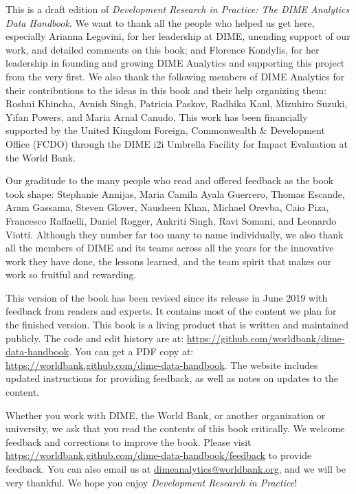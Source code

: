 This is a draft edition of
\textit{Development Research in Practice:
The DIME Analytics Data Handbook}.
We want to thank all the people who helped us get here, especially
Arianna Legovini, for her leadership at DIME, unending support of our work, 
and detailed comments on this book; and 
Florence Kondylis, for her leadership in founding and growing DIME Analytics
and supporting this project from the very first.
We also thank the following members 
of DIME Analytics for their contributions 
to the ideas in this book and their help organizing them: 
Roshni Khincha, Avnish Singh, Patricia Paskov, Radhika Kaul,
Mizuhiro Suzuki, Yifan Powers, and Maria Arnal Canudo.
This work has been financially supported by the United Kingdom Foreign, 
Commonwealth \& Development Office (FCDO) through the
 DIME i2i Umbrella Facility for Impact Evaluation at the World Bank.

Our graditude to the many people who read and offered feedback as the book took shape:
Stephanie Annijas,
Maria Camila Ayala Guerrero,
Thomas Escande,
Aram Gassama,
Steven Glover,
Nausheen Khan,
Michael Orevba,
Caio Piza,
Francesco Raffaelli,
Daniel Rogger,
Ankriti Singh,
Ravi Somani,
and Leonardo Viotti.
Although they number far too many to name individually, 
we also thank all the members of DIME and its teams across all the years
for the innovative work they have done, the lessons learned,
and the team spirit that makes our work so fruitful and rewarding.

This version of the book has been revised since its release in June 2019
with feedback from readers and experts.
It contains most of the content we plan for the finished version.
This book is a living product that is written and maintained publicly.
The code and edit history are at:
\url{https://github.com/worldbank/dime-data-handbook}.
You can get a PDF copy at:
\url{https://worldbank.github.com/dime-data-handbook}.
The website includes updated instructions
for providing feedback, as well as notes on updates to the content.

Whether you work with DIME, the World Bank,
or another organization or university,
we ask that you read the contents of this book critically.
We welcome feedback and corrections to improve the book. 
Please visit
\url{https://worldbank.github.com/dime-data-handbook/feedback} 
to provide feedback.
You can also email us at \url{dimeanalytics@worldbank.org}, 
and we will be very thankful.
We hope you enjoy \textit{Development Research in Practice}!
